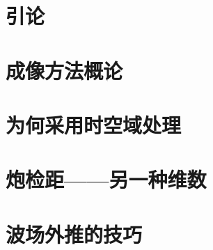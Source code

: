 %
%




\pagestyle{empty}

\frontmatter

%


\tableofcontents
\cleardoublepage
{}
\listoffigures
\cleardoublepage
{}
\listoftables

\mainmatter
\pagestyle{body}


\chapter*{引论}



\chapter{成像方法概论}








\chapter{为何采用时空域处理}
\label{chap:why-time-space}











\chapter{炮检距——另一种维数}
\label{chap:offset}










\chapter{波场外推的技巧}
\label{chap:extrapolation}










